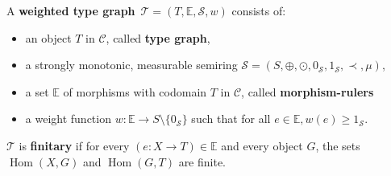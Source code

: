 \begin{definition}
    \label{def:weighted_type_graph}
    A \textbf{weighted type graph}~\(\mathcal{T} = (T, \mathbb{E}, \mathcal{S}, w)\) consists of:
    \begin{itemize} 
        \item an object \(T\) in $\mathcal{C}$, called \textbf{type graph},
        \item a strongly monotonic, measurable semiring \(\mathcal{S}=(S, \oplus, \odot, 0_\mathcal{S}, 1_\mathcal{S}, \prec, \mu)\),
        \item a set \(\mathbb{E}\) of morphisms with codomain $T$ in $\mathcal{C}$, called \textbf{morphism-rulers}
        \item a weight function \(w : \mathbb{E} \to S \setminus \{0_\mathcal{S}\}\) such that for all $e \in \mathbb{E}, w(e) \geq 1_\mathcal{S}$.
    \end{itemize}
    \(\mathcal{T}\) is \textbf{finitary} if for every \( (e :X \to T) \in \mathbb{E}\) and every object \(G\), the sets \(\operatorname{Hom}(X, G)\) and \(\operatorname{Hom}(G, T)\) are finite.
\end{definition}


